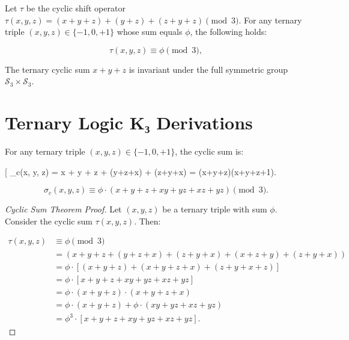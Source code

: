 \begin{theorem}
\begin{theorem}
	\label{thm:ternary-cyclic}
	Let $\tau$ be the cyclic shift operator $\tau(x, y, z) = (x + y + z) + (y + z) + (z + y + z) \pmod 3$. For any ternary triple $(x, y, z) \in \{-1, 0, +1\}$ whose sum equals $\phi$, the following holds:

	\[
		\tau(x, y, z) \equiv \phi \pmod 3,
	\]
\end{theorem}

\begin{corollary}
	\label{cor:ternary-cyclic-invariant}
	The ternary cyclic sum $x+y+z$ is invariant under the full symmetric group $\mathcal{S}_3 \times \mathcal{S}_3$.
\end{corollary}

\section{Ternary Logic K₃ Derivations}

\begin{definition}
	\label{def:cyclic-sum}
	For any ternary triple $(x, y, z) \in \{-1, 0, +1\}$, the cyclic sum is:

	[
		\sigma_c(x, y, z) = x + y + z + (y+z+x) + (z+y+x) = (x+y+z)(x+y+z+1).
	\]
\end{definition}

\begin{equation}[Cyclic Sum Formula]
	\label{eq:cyclic-sum}
	\sigma_c(x, y, z) \equiv \phi \cdot (x + y + z + xy + yz + xz + yz) \pmod 3.
	\end{equation}

\begin{proof}[Cyclic Sum Theorem Proof]
	\label{prf:cyclic-sum}
	Let $(x, y, z)$ be a ternary triple with sum $\phi$. Consider the cyclic sum $\tau(x, y, z)$. Then:

	\[
		\begin{align}
			\tau(x, y, z) &\equiv \phi \pmod 3 \\
			&= (x + y + z + (y+z+x) + (z+y+x) + (x+z+y) + (z+y+x)) \\
			&= \phi \cdot [(x + y + z) + (x+y+z+x) + (z+y+x+z)] \\
			&= \phi \cdot [x + y + z + xy + yz + xz + yz] \\
			&= \phi \cdot (x+y+z) \cdot (x+y+z+x) \\
			&= \phi \cdot (x+y+z) + \phi \cdot (xy + yz + xz + yz) \\
			&= \phi^3 \cdot [x + y + z + xy + yz + xz + yz].
		\end{align}

\]
\end{proof}
\end{theorem}
